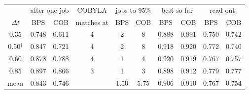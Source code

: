 \begin{tabular}{cccccccccc}
& \multicolumn{2}{c}{after one job} & COBYLA & \multicolumn{2}{c}{jobs to 95\%} & \multicolumn{2}{c}{best so far} & \multicolumn{2}{c}{read-out} \\
$\Delta t$ & BPS & COB & matches at & BPS & COB & BPS & COB & BPS & COB \\
\hline
0.35\phantom{$^\dagger$} & 0.748 & 0.611 & 4 & 2 & 8 & 0.888 & 0.891 & 0.750 & 0.742 \\
0.50$^{\dagger}$ & 0.847 & 0.721 & 4 & 2 & 8 & 0.918 & 0.920 & 0.772 & 0.740 \\
0.60\phantom{$^\dagger$} & 0.878 & 0.788 & 4 & 1 & 4 & 0.920 & 0.919 & 0.767 & 0.757 \\
0.85\phantom{$^\dagger$} & 0.897 & 0.866 & 3 & 1 & 3 & 0.898 & 0.912 & 0.779 & 0.777 \\
\hline
mean & 0.843 & 0.746 & & 1.50 & 5.75 & 0.906 & 0.910 & 0.767 & 0.754 \\
\end{tabular}
